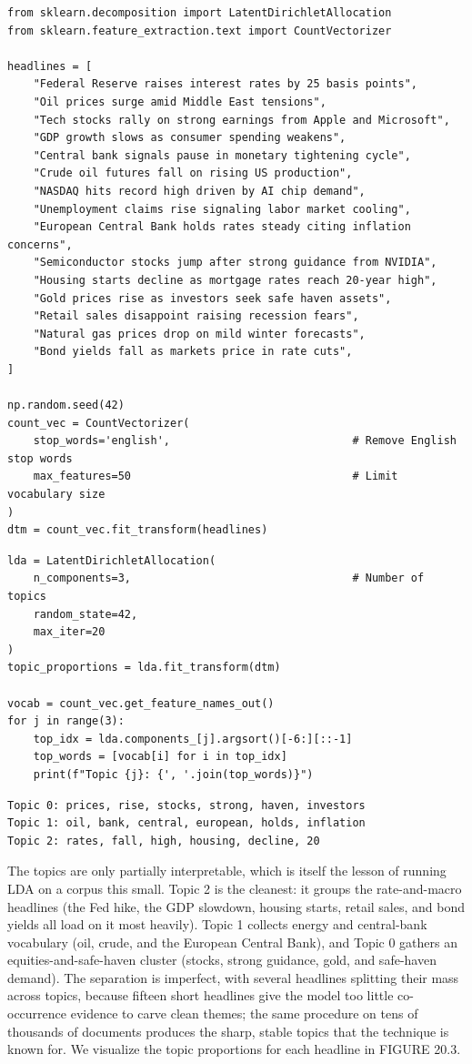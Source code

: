 \begin{verbatim}
from sklearn.decomposition import LatentDirichletAllocation
from sklearn.feature_extraction.text import CountVectorizer

headlines = [
    "Federal Reserve raises interest rates by 25 basis points",
    "Oil prices surge amid Middle East tensions",
    "Tech stocks rally on strong earnings from Apple and Microsoft",
    "GDP growth slows as consumer spending weakens",
    "Central bank signals pause in monetary tightening cycle",
    "Crude oil futures fall on rising US production",
    "NASDAQ hits record high driven by AI chip demand",
    "Unemployment claims rise signaling labor market cooling",
    "European Central Bank holds rates steady citing inflation concerns",
    "Semiconductor stocks jump after strong guidance from NVIDIA",
    "Housing starts decline as mortgage rates reach 20-year high",
    "Gold prices rise as investors seek safe haven assets",
    "Retail sales disappoint raising recession fears",
    "Natural gas prices drop on mild winter forecasts",
    "Bond yields fall as markets price in rate cuts",
]

np.random.seed(42)
count_vec = CountVectorizer(
    stop_words='english',                            # Remove English stop words
    max_features=50                                  # Limit vocabulary size
)
dtm = count_vec.fit_transform(headlines)
\end{verbatim}

\begin{verbatim}
lda = LatentDirichletAllocation(
    n_components=3,                                  # Number of topics
    random_state=42,
    max_iter=20
)
topic_proportions = lda.fit_transform(dtm)

vocab = count_vec.get_feature_names_out()
for j in range(3):
    top_idx = lda.components_[j].argsort()[-6:][::-1]
    top_words = [vocab[i] for i in top_idx]
    print(f"Topic {j}: {', '.join(top_words)}")
\end{verbatim}

\begin{verbatim}
Topic 0: prices, rise, stocks, strong, haven, investors
Topic 1: oil, bank, central, european, holds, inflation
Topic 2: rates, fall, high, housing, decline, 20
\end{verbatim}

The topics are only partially interpretable, which is itself the lesson of running LDA on a corpus this small. Topic 2 is the cleanest: it groups the rate-and-macro headlines (the Fed hike, the GDP slowdown, housing starts, retail sales, and bond yields all load on it most heavily). Topic 1 collects energy and central-bank vocabulary (oil, crude, and the European Central Bank), and Topic 0 gathers an equities-and-safe-haven cluster (stocks, strong guidance, gold, and safe-haven demand). The separation is imperfect, with several headlines splitting their mass across topics, because fifteen short headlines give the model too little co-occurrence evidence to carve clean themes; the same procedure on tens of thousands of documents produces the sharp, stable topics that the technique is known for. We visualize the topic proportions for each headline in FIGURE 20.3.

